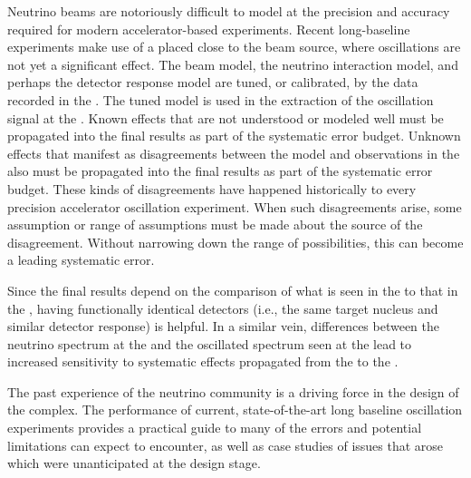 Neutrino beams are notoriously difficult to model at the precision and accuracy required for modern accelerator-based experiments.  Recent long-baseline experiments make use of a   placed close to the beam source, where oscillations are not yet a significant effect.  The beam model, the neutrino interaction model, and perhaps the detector response model are tuned, or calibrated, by the data recorded in the  . The tuned model is used in the extraction of the oscillation signal at the  . Known effects that are not understood or modeled well must be propagated into the final results as part of the systematic error budget.  Unknown effects that manifest as disagreements between the model and observations in the   also must be propagated into the final results as part of the systematic error budget.  These kinds of disagreements have happened historically to every precision accelerator oscillation experiment.  When such disagreements arise, some assumption or range of assumptions must be made about the source of the disagreement.  Without narrowing down the range of possibilities, this can become a leading systematic error.



Since the final results depend on the comparison of what is seen in the   to that in the  , having functionally identical detectors (i.e., the same target nucleus and similar detector response) is helpful.  In a similar vein, differences between the neutrino spectrum at the   and the oscillated spectrum seen at the   lead to increased sensitivity to systematic effects propagated from the   to the  .

The past experience of the neutrino community is a driving force in the design of the    complex. 
The performance of  current, state-of-the-art long baseline oscillation experiments  provides a practical guide to many of the errors and potential limitations  can expect to encounter, as well as case studies of issues that arose which were unanticipated at the design stage. 

